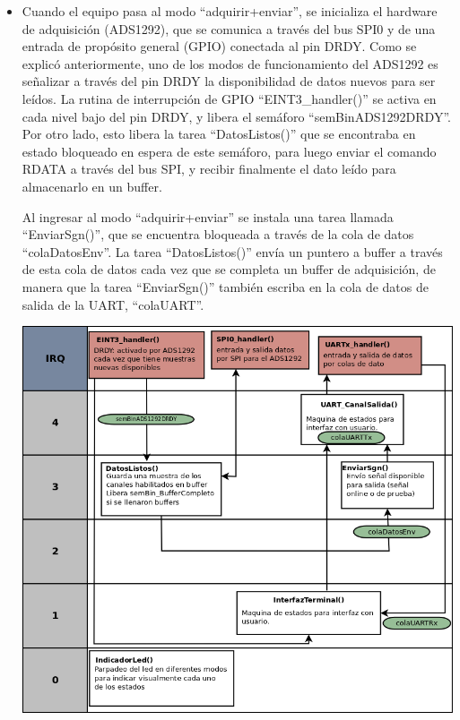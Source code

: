 \begin{itemize}
	\item Cuando el equipo pasa al modo “adquirir+enviar”, se inicializa el hardware de adquisición (ADS1292), que se comunica a través del bus SPI0 y de una entrada de propósito general (GPIO) conectada al pin DRDY. Como se explicó anteriormente, uno de los modos de funcionamiento del ADS1292 es señalizar a través del pin DRDY la disponibilidad de datos nuevos para ser leídos. La rutina de interrupción de GPIO “EINT3\_handler()” se activa en cada nivel bajo del pin DRDY, y libera el semáforo “semBinADS1292DRDY”. Por otro lado, esto libera la tarea “DatosListos()” que se encontraba en estado bloqueado en espera de este semáforo, para luego enviar el comando RDATA a través del bus SPI, y recibir finalmente el dato leído para almacenarlo en un buffer. 

		Al ingresar al modo “adquirir+enviar” se instala una tarea llamada “EnviarSgn()”, que se encuentra bloqueada a través de la cola de datos “colaDatosEnv”. La tarea “DatosListos()” envía un puntero a buffer a través de esta cola de datos cada vez que se completa un buffer de adquisición, de manera que la tarea “EnviarSgn()” también escriba en la cola de datos de salida de la UART, “colaUART”.
		
\begin{adjustbox}{center,caption={Diagrama de tareas en modo adquirir y enviar},label={fig:VOP24_tareas_v1_adquirirEnviar},nofloat=figure,vspace=\bigskipamount}
\includegraphics[scale = 0.32]{./Figures/VOP24_tareas_v1_adquirirEnviar.png}
\end{adjustbox}		
		

\end{itemize}

